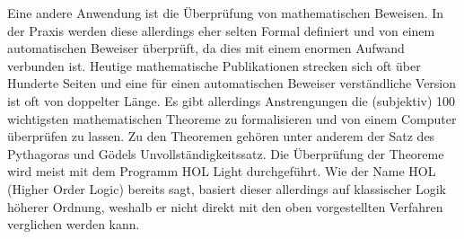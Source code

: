 Eine andere Anwendung ist die Überprüfung von mathematischen Beweisen. In der Praxis werden diese allerdings eher selten Formal definiert und von einem automatischen Beweiser überprüft, da dies mit einem enormen Aufwand verbunden ist. Heutige mathematische Publikationen strecken sich oft über Hunderte Seiten und eine für einen automatischen Beweiser verständliche Version ist oft von doppelter Länge. Es gibt allerdings Anstrengungen die (subjektiv) 100 wichtigsten mathematischen Theoreme zu formalisieren und von einem Computer überprüfen zu lassen. \cite{formalize_100_theorems} Zu den Theoremen gehören unter anderem der Satz des Pythagoras und Gödels Unvollständigkeitssatz. Die Überprüfung der Theoreme wird meist mit dem Programm HOL Light durchgeführt. Wie der Name HOL (Higher Order Logic) bereits sagt, basiert dieser allerdings auf klassischer Logik höherer Ordnung, weshalb er nicht direkt mit den oben vorgestellten Verfahren verglichen werden kann.
